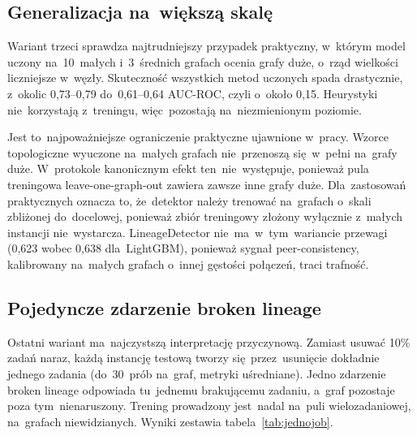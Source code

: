 \documentclass[polish,master,a4paper,oneside]{ppfcmthesis}
\renewcommand{\_}{\origtextunderscore\ifmmode\else\allowbreak\fi}
\begin{document}
\subsection{Generalizacja na~większą skalę}

Wariant trzeci sprawdza najtrudniejszy przypadek praktyczny, w~którym model uczony
na~10~małych i~3~średnich grafach ocenia grafy duże, o~rząd wielkości liczniejsze
w~węzły. Skuteczność wszystkich metod uczonych spada drastycznie, z~okolic
0{,}73--0{,}79 do~0{,}61--0{,}64 AUC-ROC, czyli o~około 0{,}15. Heurystyki
nie~korzystają z~treningu, więc~pozostają na~niezmienionym poziomie.

Jest to~najpoważniejsze ograniczenie praktyczne ujawnione w~pracy. Wzorce
topologiczne wyuczone na~małych grafach nie~przenoszą się~w~pełni na~grafy
duże. W~protokole kanonicznym efekt ten~nie~występuje, ponieważ pula
treningowa leave-one-graph-out zawiera zawsze inne grafy duże.
Dla~zastosowań praktycznych oznacza to, że~detektor należy trenować
na~grafach o~skali zbliżonej do~docelowej, ponieważ zbiór treningowy złożony
wyłącznie z~małych instancji nie~wystarcza. LineageDetector nie~ma~w~tym~wariancie
przewagi (0{,}623 wobec 0{,}638 dla~LightGBM), ponieważ sygnał
peer-consistency, kalibrowany na~małych grafach o~innej gęstości połączeń,
traci trafność.

\subsection{Pojedyncze zdarzenie broken lineage}
\label{sec:jednojob}

Ostatni wariant ma~najczystszą interpretację przyczynową. Zamiast usuwać
10\% zadań naraz, każdą instancję testową tworzy się~przez~usunięcie
dokładnie jednego zadania (do~30~prób na~graf, metryki uśredniane).
Jedno zdarzenie broken lineage odpowiada tu~jednemu brakującemu zadaniu,
a~graf pozostaje poza tym~nienaruszony. Trening prowadzony jest~nadal
na~puli wielozadaniowej, na~grafach niewidzianych. Wyniki zestawia
tabela~\ref{tab:jednojob}.
\end{document}
